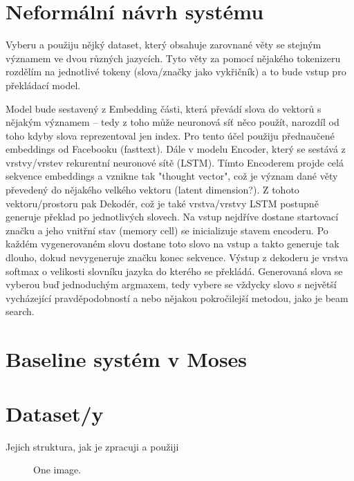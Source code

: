 \section{Neformální návrh systému}
Vyberu a použiju nějký dataset, který obsahuje zarovnané věty se stejným významem ve dvou různých jazycích. Tyto věty za pomocí nějakého tokenizeru rozdělím na jednotlivé tokeny (slova/značky jako vykřičník) a to bude vstup pro překládací model.

Model bude sestavený z Embedding části, která převádí slova do vektorů s nějakým významem -- tedy z toho může neuronová síť něco použít, narozdíl od toho kdyby slova reprezentoval jen index. Pro tento účel použiju přednaučené embeddings od Facebooku (fasttext). Dále v modelu Encoder, který se sestává z vrstvy/vrstev rekurentní neuronové sítě (LSTM). Tímto Encoderem projde celá sekvence embeddings a vznikne tak "thought vector", což je význam dané věty převedený do nějakého velkého vektoru (latent dimension?). Z tohoto vektoru/prostoru pak Dekodér, což je také vrstva/vrstvy LSTM postupně generuje překlad po jednotlivých slovech. Na vstup nejdříve dostane startovací značku a jeho vnitřní stav (memory cell) se inicializuje stavem encoderu. Po každém vygenerovaném slovu dostane toto slovo na vstup a takto generuje tak dlouho, dokud nevygeneruje značku konec sekvence. Výstup z dekoderu je vrstva softmax o velikosti slovníku jazyka do kterého se překládá. Generovaná slova se vyberou buď jednoduchým argmaxem, tedy vybere se vždycky slovo s největší vycházející pravděpodobností a nebo nějakou pokročilejší metodou, jako je beam search.


\section{Baseline systém v Moses}

\section{Dataset/y}
Jejich struktura, jak je zpracuji a použiji
\begin{figure}
    \begin{center}
    \end{center}
	\caption{One image. }
	\label{img:TODO}
\end{figure}


